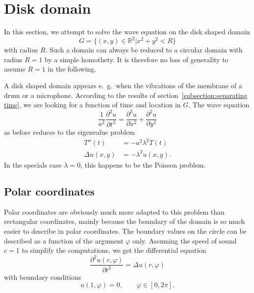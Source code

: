 %
%
%
\section{Disk domain}
In this section, we attempt to solve the wave equation on the
disk shaped domain
\[
G=\{(x,y)\in\mathbb R^2|x^2+y^2 < R\}
\]
with radius $R$.
Such a domain can always be reduced to a circular domain with radius
$R=1$ by a simple homothety.
It is therefore no loss of generality to assume $R=1$ in the following.

A disk shaped domain appears e.~g.~when the vibrations of the membrane of
a drum or a microphone.
According to the results of section~\ref{subsection:separating time},
we are looking for a function of time and location in $G$.
The wave equation
\[
\frac1{a^2}\frac{\partial^2 u}{\partial t^2}
=
\frac{\partial^2 u}{\partial x^2}+\frac{\partial^2 u}{\partial y^2}
\]
as before reduces to the eigenvalue problem
\begin{align*}
T''(t)&=-a^2\lambda^2 T(t)\\
\Delta u(x,y)&=-\lambda^2u(x,y).
\end{align*}
In the specials case $\lambda=0$, this happens to be the Poisson problem.

\subsection{Polar coordinates}
Polar coordinates are obviously much more adapted to this problem than
rectangular coordinates, mainly because the boundary of the domain
is so much easier to describe in polar coordinates.
The boundary values on the circle can be described as a function
of the argument $\varphi$ only.
Assuming the speed of sound $c=1$ to simplify the computations, we
get the differential equation
\[
\frac{\partial^2u(r,\varphi)}{\partial t^2}=\Delta u(r,\varphi)
\]
with boundary conditions
\[
u(1,\varphi)=0,\qquad\varphi\in[0,2\pi].
\]

